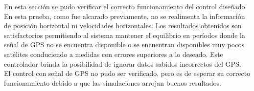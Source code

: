 \documentclass[main]{subfiles}
\begin{document}
En esta secci\'on se pudo verificar el correcto funcionamiento del control diseñado. En esta prueba, como fue alcarado previamente, no se realimenta la informaci\'on de posici\'on horizontal ni velocidades horizontales. Los resultados obtenidos son satisfactorios permitiendo al sistema mantener el equilibrio en per\'iodos donde la señal de GPS no se encuentra disponible o se encuentran disponibles muy pocos sat\'elites conduciendo a medidas con errores superiores a lo deseado. Este controlador brinda la posibilidad de ignorar datos sabidos incorrectos del GPS.\\

El control con señal de GPS no pudo ser verificado, pero es de esperar su correcto funcionamiento debido a que las simulaciones arrojan buenos resultados.
\end{document}
